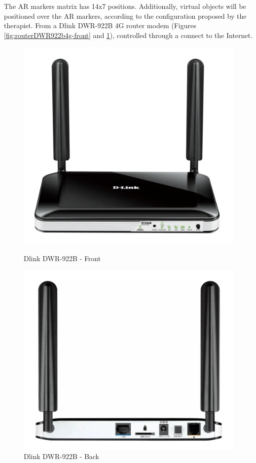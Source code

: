The AR markers matrix has 14x7 positions. Additionally, virtual objects will be positioned over the AR markers, according to the configuration proposed by the therapist. From a Dlink DWR-922B 4G router modem (Figures \ref{fig:routerDWR922b4g-front} and \ref{fig:routerDWR922b4g-back}), controlled through a connect to the Internet.

\begin{figure}[!htbp]
\center
\begin{minipage}{0.45\linewidth}
\center
\captionsetup{justification=centering,margin=0cm,font=small}
\includegraphics[width=0.8\linewidth]{img/cap4/routerDWR922b4g-front}
\caption{Dlink DWR-922B - Front} \label{fig:routerDWR922b4g-front}
\end{minipage}
\begin{minipage}{0.45\linewidth}
\center
\captionsetup{justification=centering,margin=0cm,font=small}
\includegraphics[width=0.88\linewidth]{img/cap4/routerDWR922b4g-back}
\caption{Dlink DWR-922B - Back} \label{fig:routerDWR922b4g-back}
\end{minipage}
\end{figure}

